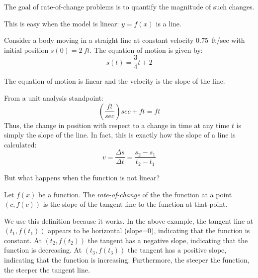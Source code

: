 \documentclass[letterpaper,12pt,fleqn]{article}
\begin{document}
The goal of rate-of-change problems is to quantify the magnitude of such changes.

This is easy when the model is linear: \(y=f(x)\) is a line.

\begin{example}
  Consider a body moving in a straight line at constant velocity \SI{0.75}{ft/sec} with initial position
  \(s(0)=\SI{2}{ft}\).  The equation of motion is given by:
  \[s(t)=\frac{3}{4}t+2\]
  \begin{center}
  \end{center}

  \bigskip

  The equation of motion is linear and the velocity is the slope of the line.

  From a unit analysis standpoint:
  \[\left(\frac{\si{ft}}{\si{sec}}\right)\si{sec}+\si{ft}=\si{ft}\]
  Thus, the change in position with respect to a change in time at any time \(t\) is simply the slope of the line.
  In fact, this is exactly how the slope of a line is calculated:
  \[v=\frac{\Delta s}{\Delta t}=\frac{s_2-s_1}{t_2-t_1}\]
\end{example}

But what happens when the function is not linear?

\begin{definition}
  Let \(f(x)\) be a function.  The \emph{rate-of-change} of the the function at a point \((c,f(c))\) is the slope
  of the tangent line to the function at that point.
\end{definition}

We use this definition because it works.  In the above example, the tangent line at \((t_1,f(t_1))\) appears to be
horizontal (slope=0), indicating that the function is constant.  At \((t_2,f(t_2))\) the tangent has a negative
slope, indicating that the function is decreasing.  At \((t_3,f(t_3))\) the tangent has a positive slope, indicating
that the function is increasing.  Furthermore, the steeper the function, the steeper the tangent line.
\end{document}
